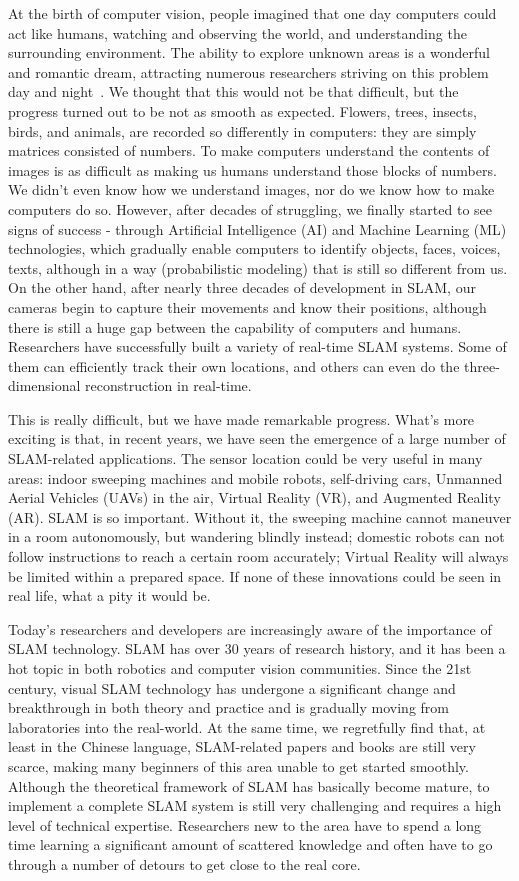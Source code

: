At the birth of computer vision, people imagined that one day computers could act like humans, watching and observing the world, and understanding the surrounding environment. The ability to explore unknown areas is a wonderful and romantic dream, attracting numerous researchers striving on this problem day and night~\cite{Hartley2003}. We thought that this would not be that difficult, but the progress turned out to be not as smooth as expected. Flowers, trees, insects, birds, and animals, are recorded so differently in computers: they are simply matrices consisted of numbers. To make computers understand the contents of images is as difficult as making us humans understand those blocks of numbers. We didn't even know how we understand images, nor do we know how to make computers do so. However, after decades of struggling,  we finally started to see signs of success - through Artificial Intelligence (AI) and Machine Learning (ML) technologies, which gradually enable computers to identify objects, faces, voices, texts, although in a way (probabilistic modeling) that is still so different from us. On the other hand, after nearly three decades of development in SLAM, our cameras begin to capture their movements and know their positions, although there is still a huge gap between the capability of computers and humans. Researchers have successfully built a variety of real-time SLAM systems. Some of them can efficiently track their own locations, and others can even do the three-dimensional reconstruction in real-time.

This is really difficult, but we have made remarkable progress. What's more exciting is that, in recent years, we have seen the emergence of a large number of SLAM-related applications. The sensor location could be very useful in many areas: indoor sweeping machines and mobile robots, self-driving cars, Unmanned Aerial Vehicles (UAVs) in the air, Virtual Reality (VR), and Augmented Reality (AR). SLAM is so important. Without it, the sweeping machine cannot maneuver in a room autonomously, but wandering blindly instead; domestic robots can not follow instructions to reach a certain room accurately; Virtual Reality will always be limited within a prepared space. If none of these innovations could be seen in real life, what a pity it would be.

Today's researchers and developers are increasingly aware of the importance of SLAM technology. SLAM has over 30 years of research history, and it has been a hot topic in both robotics and computer vision communities. Since the 21st century, visual SLAM technology has undergone a significant change and breakthrough in both theory and practice and is gradually moving from laboratories into the real-world. At the same time, we regretfully find that, at least in the Chinese language, SLAM-related papers and books are still very scarce, making many beginners of this area unable to get started smoothly. Although the theoretical framework of SLAM has basically become mature, to implement a complete SLAM system is still very challenging and requires a high level of technical expertise. Researchers new to the area have to spend a long time learning a significant amount of scattered knowledge and often have to go through a number of detours to get close to the real core.


